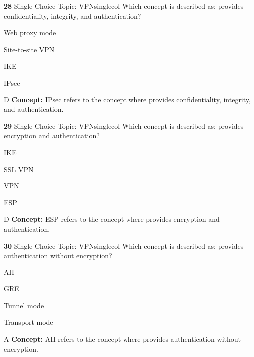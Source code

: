\documentclass[10pt,a4paper]{article}
\begin{document}
\begin{qcard}{\color{white}\textbf{28} \hfill \small Single Choice \textbar{} Topic: VPN}{singlecol}
Which concept is described as: provides confidentiality, integrity, and authentication?

\begin{qoptions}
\item Web proxy mode
\item Site-to-site VPN
\item IKE
\item IPsec
\end{qoptions}
\begin{explainbox}{D}
\textbf{Concept:} IPsec refers to the concept where provides confidentiality, integrity, and authentication.
\end{explainbox}
\end{qcard}

\begin{qcard}{\color{white}\textbf{29} \hfill \small Single Choice \textbar{} Topic: VPN}{singlecol}
Which concept is described as: provides encryption and authentication?

\begin{qoptions}
\item IKE
\item SSL VPN
\item VPN
\item ESP
\end{qoptions}
\begin{explainbox}{D}
\textbf{Concept:} ESP refers to the concept where provides encryption and authentication.
\end{explainbox}
\end{qcard}

\begin{qcard}{\color{white}\textbf{30} \hfill \small Single Choice \textbar{} Topic: VPN}{singlecol}
Which concept is described as: provides authentication without encryption?

\begin{qoptions}
\item AH
\item GRE
\item Tunnel mode
\item Transport mode
\end{qoptions}
\begin{explainbox}{A}
\textbf{Concept:} AH refers to the concept where provides authentication without encryption.
\end{explainbox}
\end{qcard}
\end{document}
